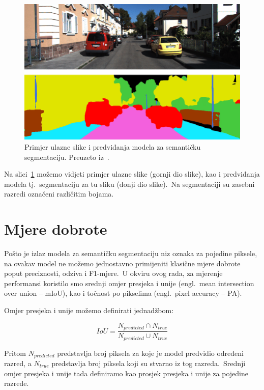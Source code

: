 \documentclass[times, utf8, seminar, numeric]{fer}
\begin{document}
\begin{figure}[htb]
    \centering
    \includegraphics[scale=0.4]{./Slike/sem_seg.png}
    \caption{Primjer ulazne slike i predviđanja modela za semantičku segmentaciju. Preuzeto iz~\cite{jeong2018towards}.}
    \label{fig:semseg}
\end{figure}

\pagebreak

Na slici~\ref{fig:semseg} možemo vidjeti primjer ulazne slike (gornji dio slike), kao i predviđanja modela tj.\ segmentaciju za tu sliku (donji dio slike).\ 
Na segmentaciji su zasebni razredi označeni različitim bojama.\

\section{Mjere dobrote}

Pošto je izlaz modela za semantičku segmentaciju niz oznaka za pojedine piksele, na ovakav model ne možemo jednostavno primijeniti klasične mjere dobrote poput preciznosti, odziva i F1-mjere.\ 
U okviru ovog rada, za mjerenje performansi koristilo smo srednji omjer presjeka i unije (engl.\ mean intersection over union – mIoU), kao i točnost po pikselima (engl.\ pixel accuracy – PA).\

Omjer presjeka i unije možemo definirati jednadžbom:

\begin{equation}
    IoU = \frac{N_{predicted} \cap N_{true}}{N_{predicted} \cup N_{true}}
    \label{eq:IoU}
\end{equation}

Pritom $N_{predicted}$ predstavlja broj piksela za koje je model predvidio određeni razred, a $N_{true}$ predstavlja broj piksela koji su stvarno iz tog razreda.\ 
Srednji omjer presjeka i unije tada definiramo kao prosjek presjeka i unije za pojedine razrede.\ 
  
\end{document}
